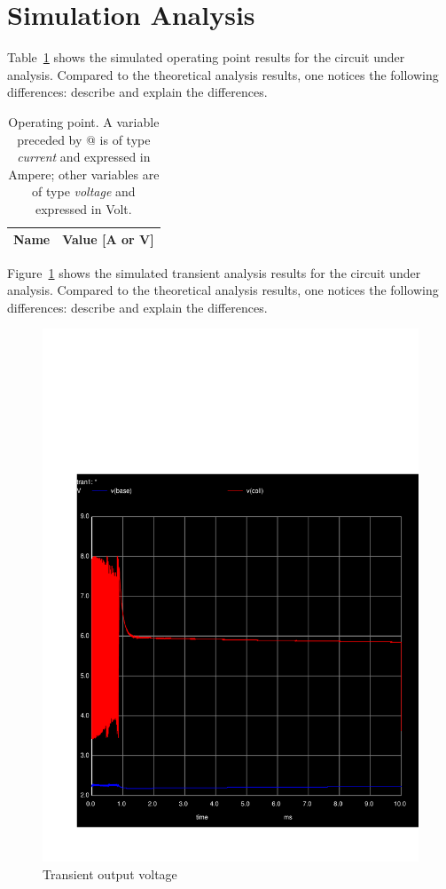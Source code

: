 \section{Simulation Analysis}
\label{sec:simulation}


Table~\ref{tab:op} shows the simulated operating point results for the circuit
under analysis. Compared to the theoretical analysis results, one notices the
following differences: describe and explain the differences.

\begin{table}[h]
  \centering
  \begin{tabular}{|l|r|}
    \hline    
    {\bf Name} & {\bf Value [A or V]} \\ \hline
    
  \end{tabular}
  \caption{Operating point. A variable preceded by @ is of type {\em current}
    and expressed in Ampere; other variables are of type {\it voltage} and expressed in
    Volt.}
  \label{tab:op}
\end{table}

\lipsum[1-1]



Figure~\ref{fig:trans} shows the simulated transient analysis results for the
circuit under analysis. Compared to the theoretical analysis results, one
notices the following differences: describe and explain the differences.

\begin{figure}[h] \centering
\includegraphics[width=0.6\linewidth]{trans.pdf}
\caption{Transient output voltage}
\label{fig:trans}
\end{figure}

